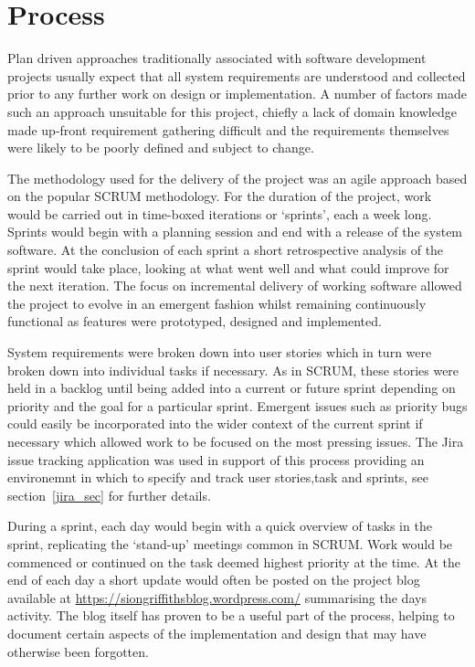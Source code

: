 \section{Process}

Plan driven approaches traditionally associated with software development projects usually expect that all system requirements are understood and collected prior to any further work on design or implementation. A number of factors made such an approach unsuitable for this project, chiefly a lack of domain knowledge made up-front requirement gathering difficult and the requirements themselves were likely to be poorly defined and subject to change. 

The methodology used for the delivery of the project was an agile approach based on the popular SCRUM methodology. For the duration of the project, work would be carried out in time-boxed iterations or `sprints', each a week long. Sprints would begin with a planning session and end with a release of the system software. At the conclusion of each sprint a short retrospective analysis of the sprint would take place, looking at what went well and what could improve for the next iteration. The focus on incremental delivery of working software allowed the project to evolve in an emergent fashion whilst remaining continuously functional as features were prototyped, designed and implemented.  

System requirements were broken down into user stories which in turn were broken down into individual tasks if necessary. As in SCRUM, these stories were held in a backlog until being added into a current or future sprint depending on priority and the goal for a particular sprint. Emergent issues such as priority bugs could easily be incorporated into the wider context of the current sprint if necessary which allowed work to be focused on the most pressing issues. The Jira \cite{jira} issue tracking application was used in support of this process providing an environemnt in which to specify and track user stories,task and sprints, see section~\ref{jira_sec} for further details. 

During a sprint, each day would begin with a quick overview of tasks in the sprint, replicating the `stand-up' meetings common in SCRUM. Work would be commenced or continued on the task deemed highest priority at the time. At the end of each day a short update would often be posted on the project blog available at \url{https://siongriffithsblog.wordpress.com/} summarising the days activity. The blog itself has proven to be a useful part of the process, helping to document certain aspects of the implementation and design that may have otherwise been forgotten.



